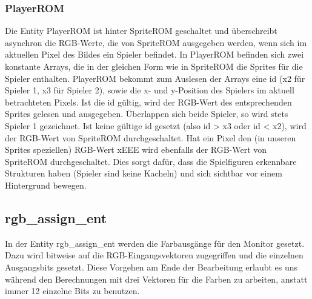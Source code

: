 \documentclass[parskip=full]{scrartcl}
\begin{document}
				\subsubsection{PlayerROM}
					Die Entity PlayerROM ist hinter SpriteROM geschaltet und überschreibt asynchron die RGB-Werte, die von SpriteROM ausgegeben werden, wenn sich im aktuellen Pixel des Bildes ein Spieler befindet. In PlayerROM befinden sich zwei konstante Arrays, die in der gleichen Form wie in SpriteROM die Sprites für die Spieler enthalten. PlayerROM bekommt zum Auslesen der Arrays eine id (x2 für Spieler 1, x3 für Spieler 2), sowie die x- und y-Position des Spielers im aktuell betrachteten Pixels. Ist die id gültig, wird der RGB-Wert des entsprechenden Sprites gelesen und ausgegeben. Überlappen sich beide Spieler, so wird stets Spieler 1 gezeichnet.
					Ist keine gültige id gesetzt (also id > x3 oder id < x2), wird der RGB-Wert von SpriteROM durchgeschaltet.
					Hat ein Pixel den (in unseren Sprites speziellen) RGB-Wert xEEE wird ebenfalls der RGB-Wert von SpriteROM durchgeschaltet. Dies sorgt dafür, dass die Spielfiguren erkennbare Strukturen haben (Spieler sind keine Kacheln) und sich sichtbar vor einem Hintergrund bewegen.
				
			\subsection{rgb\_assign\_ent}
				In der Entity rgb\_assign\_ent werden die Farbausgänge für den Monitor gesetzt. Dazu wird bitweise auf die RGB-Eingangsvektoren zugegriffen und die einzelnen Ausgangsbits gesetzt. Diese Vorgehen am Ende der Bearbeitung erlaubt es uns während den Berechnungen mit drei Vektoren für die Farben zu arbeiten, anstatt immer 12 einzelne Bits zu benutzen.
		
\end{document}
